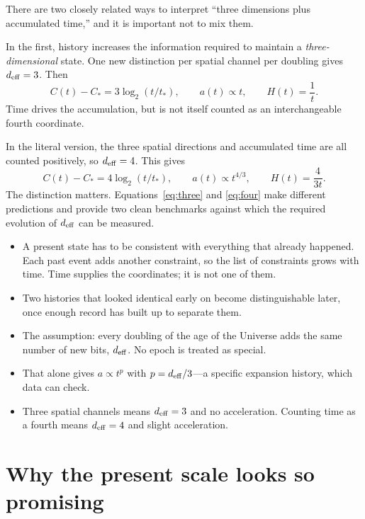 \documentclass[10pt]{article}
\newenvironment{persuasions}
  {\begin{cpbox}\small\setlength{\parskip}{0pt}%
   {\footnotesize\bfseries\color{accent}%
    \textls[110]{CONCEPTUAL PERSUASIONS}}\par\vspace{3pt}%
   \begin{itemize}[leftmargin=1.15em,itemsep=2.5pt,topsep=0pt,parsep=0pt,
                   label=\textcolor{accent}{\scriptsize$\blacktriangleright$}]}
  {\end{itemize}\end{cpbox}}
\begin{document}
There are two closely related ways to interpret ``three dimensions plus
accumulated time,'' and it is important not to mix them.

In the first, history increases the information required to maintain a
\emph{three-dimensional} state.  One new distinction per spatial channel per
doubling gives $d_{\rm eff}=3$.  Then
\begin{equation}
C(t)-C_*=3\log_2(t/t_*),\qquad
a(t)\propto t,\qquad H(t)=\frac{1}{t}.
\label{eq:three}
\end{equation}
Time drives the accumulation, but is not itself counted as an interchangeable
fourth coordinate.

In the literal version, the three spatial directions and accumulated time are
all counted positively, so $d_{\rm eff}=4$.  This gives
\begin{equation}
C(t)-C_*=4\log_2(t/t_*),\qquad
a(t)\propto t^{4/3},\qquad H(t)=\frac{4}{3t}.
\label{eq:four}
\end{equation}
The distinction matters.  Equations~\eqref{eq:three} and \eqref{eq:four} make
different predictions and provide two clean benchmarks against which the
required evolution of $d_{\rm eff}$ can be measured.

\begin{persuasions}
\item A present state has to be consistent with everything that already
happened.  Each past event adds another constraint, so the list of constraints
grows with time.  Time supplies the coordinates; it is not one of them.
\item Two histories that looked identical early on become distinguishable
later, once enough record has built up to separate them.
\item The assumption: every doubling of the age of the Universe adds the same
number of new bits, $d_{\rm eff}$.  No epoch is treated as special.
\item That alone gives $a\propto t^{p}$ with $p=d_{\rm eff}/3$---a specific
expansion history, which data can check.
\item Three spatial channels means $d_{\rm eff}=3$ and no acceleration.
Counting time as a fourth means $d_{\rm eff}=4$ and slight acceleration.
\end{persuasions}

\section*{Why the present scale looks so promising}
\end{document}
